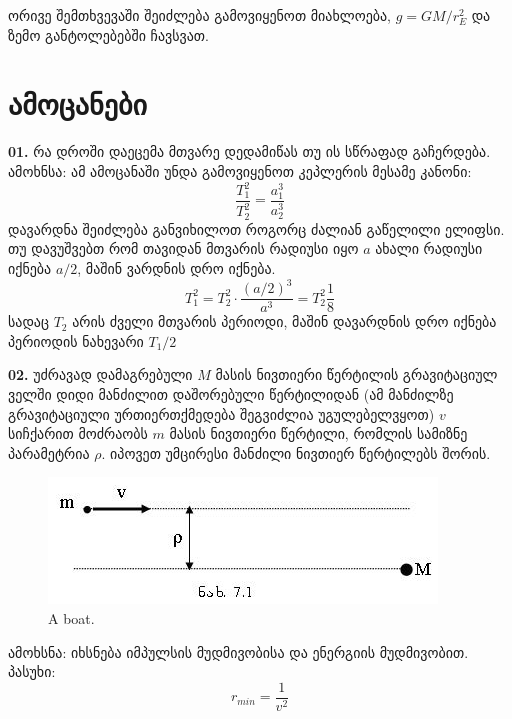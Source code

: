 \documentclass[a4paper]{article}
\begin{document}
ორივე შემთხვევაში შეიძლება გამოვიყენოთ მიახლოება, $g = GM/r_E^2$ და ზემო განტოლებებში ჩავსვათ.


\section{ამოცანები}
\textbf{01.} რა დროში დაეცემა მთვარე დედამიწას თუ ის სწრაფად გაჩერდება.\\
ამოხნსა: ამ ამოცანაში უნდა გამოვიყენოთ კეპლერის მესამე კანონი:
	\begin{equation}
		\frac{T_1^2}{T_2^2} = \frac{a_1^3}{a_2^3}
	\end{equation}
დავარდნა შეიძლება განვიხილოთ როგორც ძალიან გაწელილი ელიფსი. თუ დავუშვებთ რომ თავიდან მთვარის რადიუსი იყო $a$ ახალი რადიუსი იქნება $a/2$, მაშინ ვარდნის დრო იქნება.
	\begin{equation}
		T_1^2 = T_2^2\cdot\frac{(a/2)^3}{a^3} = T_2^2 \frac{1}{8}
	\end{equation}
სადაც $T_2$ არის ძველი მთვარის პერიოდი, მაშინ დავარდნის დრო იქნება პერიოდის ნახევარი $T_1/2$

\textbf{02.} უძრავად დამაგრებული $M$ მასის ნივთიერი წერტილის გრავიტაციულ ველში დიდი მანძილით დაშორებული წერტილიდან (ამ მანძილზე
გრავიტაციული ურთიერთქმედება შეგვიძლია უგულებელვყოთ) $v$ სიჩქარით მოძრაობს $m$ მასის ნივთიერი წერტილი, რომლის სამიზნე პარამეტრია $\rho$. იპოვეთ უმცირესი მანძილი ნივთიერ წერტილებს შორის.
		\begin{figure}[H]
           \includegraphics[width=\linewidth = 0.6]{figures/fig_1}
           \caption{A boat.}
           \label{fig:boat1}
        \end{figure}
        
ამოხსნა:	იხსნება იმპულსის მუდმივობისა და ენერგიის მუდმივობით.\\
პასუხი: $$ r_{min} = \frac{1}{v^2} $$
\end{document}
